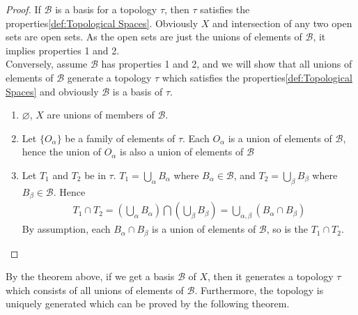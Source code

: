 \begin{proof}
    If $\mathcal{B}$ is a basis for a topology $\tau$, then $\tau$
    satisfies the properties\ref{def:Topological Spaces}. Obviously
    $X$ and intersection of any two open sets are open sets. As the
    open sets are just the unions of elements of $\mathcal{B}$, it
    implies properties 1 and 2.\\
    Conversely, assume $\mathcal{B}$ has properties 1 and 2, and we will
    show that all unions of elements of $\mathcal{B}$ generate a
    topology $\tau$ which satisfies the
    properties\ref{def:Topological Spaces} and obviously
    $\mathcal{B}$ is a basis of $\tau$.
    \begin{enumerate}

        \item $\varnothing$, $X$ are unions of members of $\mathcal{B}$.
        \item Let $\{O_{\alpha}\}$ be a family of elements of $\tau$. Each
            $O_{\alpha}$ is a union of elements of $\mathcal{B}$, hence
            the union of $O_{\alpha}$ is also a union of elements of
            $\mathcal{B}$
        \item Let $T_{1}$ and $T_{2}$ be in $\tau$. $T_{1} =
            \bigcup_{\alpha} B_{\alpha}$ where
            $B_{\alpha} \in \mathcal{B}$, and $T_{2} =
            \bigcup_{\beta} B_{\beta}$ where
            $B_{\beta} \in \mathcal{B}$. Hence
            \begin{align*}
                T_{1} \cap T_{2} = \left(\bigcup_{\alpha}
                B_{\alpha}\right) \bigcap \left(\bigcup_{\beta}
                B_{\beta}\right) = \bigcup_{\alpha, \beta} \left(B_{\alpha}
                \cap B_{\beta}\right)
            \end{align*}
            By assumption, each $B_{\alpha} \cap B_{\beta}$ is a
            union of elements of $\mathcal{B}$, so is the $T_{1} \cap T_{2}$.
    \end{enumerate}

\end{proof}

\begin{remarks}
    By the theorem above, if we get a basis $\mathcal{B}$ of $X$,
    then it generates a topology $\tau$ which consists
    of all unions of elements of $\mathcal{B}$. Furthermore, the
    topology is uniquely generated which can be proved by the following theorem.
\end{remarks}

